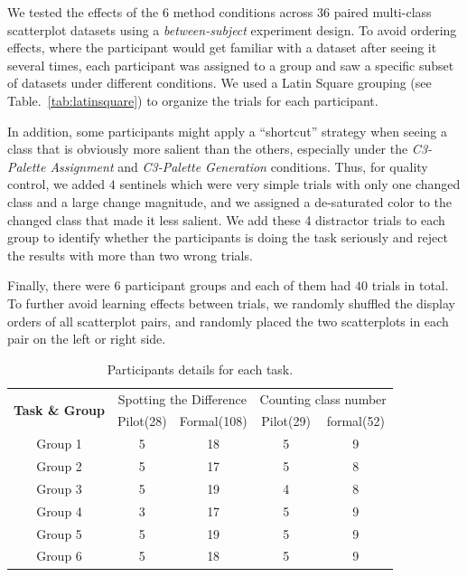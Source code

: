 \vspace{.3em}
 We tested the effects of the $6$ method conditions across $36$ paired multi-class scatterplot datasets using a \emph{between-subject} experiment design. To avoid ordering effects, where the participant would get familiar with a dataset after seeing it several times, each participant was assigned to a group and saw a specific subset of datasets under different conditions. We used a Latin Square grouping (see Table.~\ref{tab:latinsquare}) to organize the trials for each participant. %

In addition, some participants might apply a ``shortcut'' strategy when seeing a class that is obviously more salient than the others, especially under the \emph{C3-Palette Assignment} and \emph{C3-Palette Generation} conditions. Thus, for quality control, we added $4$ sentinels which were very simple trials with only one changed class and a large change magnitude, and we assigned a de-saturated color to the changed class that made it less salient. We add these 4 distractor trials to each group to identify whether the participants is doing the task seriously and reject the results with more than two wrong trials.

Finally, there were $6$ participant groups and each of them had $40$ trials in total. To further avoid learning effects between trials, we randomly shuffled the display orders of all scatterplot pairs, and randomly placed the two scatterplots in each pair on the left or right side.

\begin{table}[ht]
\renewcommand\arraystretch{1}
\centering
\caption{Participants details for each task.}
\label{tab:participantDetail}
\begin{tabular}{|c|c|c|c|c|}
\hline
\multirow{2}{*}{\textbf{Task \& Group}} & \multicolumn{2}{c|}{Spotting the Difference} & \multicolumn{2}{c|}{Counting class number} \\
\cline{2-5}
& Pilot(28) & Formal(108) & Pilot(29) & formal(52) \\
\hline
Group 1 & 5 & 18 & 5  & 9 \\
\hline
Group 2 & 5 & 17 & 5  & 8 \\
\hline
Group 3 & 5 & 19 & 4  & 8 \\
\hline
Group 4 & 3 & 17 & 5  & 9 \\
\hline
Group 5 & 5 & 19 & 5  & 9 \\
\hline
Group 6 & 5 & 18 & 5  & 9 \\
\hline
\end{tabular}
\end{table}

